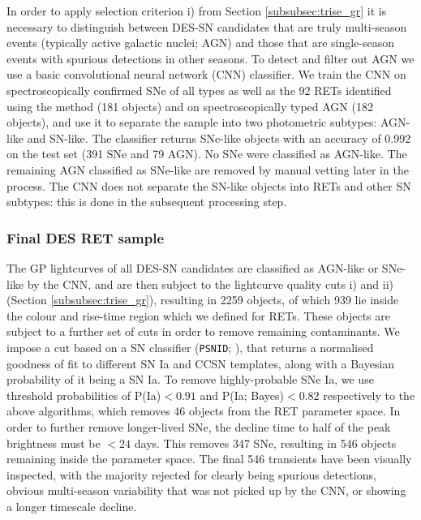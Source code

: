 \documentclass[fleqn,usenatbib,]{mnras}
\begin{document}
In order to apply selection criterion i) from Section \ref{subsubsec:trise_gr} it is necessary to distinguish between DES-SN candidates that are truly multi-season events (typically active galactic nuclei; AGN) and those that are single-season events with spurious detections in other seasons. 
To detect and filter out AGN we use a basic convolutional neural network (CNN) classifier. We train the CNN on spectroscopically confirmed SNe of all types as well as the 92 RETs identified using the  method (181 objects) and on spectroscopically typed AGN (182 objects), and use it to separate the sample into two photometric subtypes: AGN-like and SN-like. The classifier returns SNe-like objects with an accuracy of 0.992 on the test set (391 SNe and 79 AGN). No SNe were classified as AGN-like. The remaining AGN classified as SNe-like are removed by manual vetting later in the process. The CNN does not separate the SN-like objects into RETs and other SN subtypes: this is done in the subsequent processing step.

\subsubsection{Final DES RET sample}
The GP lightcurves of all DES-SN candidates are classified as AGN-like or SNe-like by the CNN, and are then subject to the lightcurve quality cuts i) and ii) (Section \ref{subsubsec:trise_gr}), resulting in 2259 objects, of which 939 lie inside the colour and rise-time region which we defined for RETs. These objects are subject to a further set of cuts in order to remove remaining contaminants. We impose a cut based on a SN classifier (\texttt{PSNID}; \citealt{Sako2008}), that returns a normalised goodness of fit to different SN Ia and CCSN templates, along with a Bayesian probability of it being a SN Ia. To remove highly-probable SNe Ia, we use threshold probabilities of P(Ia)$<0.91$ and P(Ia; Bayes)$<0.82$ respectively to the above algorithms, which removes 46 objects from the RET parameter space. In order to further remove longer-lived SNe, the decline time to half of the peak brightness must be $<24$ days. This removes 347 SNe, resulting in 546 objects remaining inside the parameter space. The final 546 transients have been visually inspected, with the majority rejected for clearly being spurious detections, obvious multi-season variability that was not picked up by the CNN, or showing a longer timescale decline. 
\end{document}
